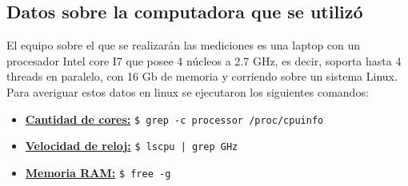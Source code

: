 \subsection{Datos sobre la computadora que se utilizó}
    El equipo sobre el que se realizarán las mediciones es una laptop con un
    procesador Intel core I7 que posee 4 núcleos a 2.7 GHz, es decir, soporta
    hasta 4 threads en paralelo, con 16 Gb de memoria y corriendo sobre un
    sistema Linux.\\
    Para averiguar estos datos en linux se ejecutaron los siguientes comandos:\\
    \begin{itemize}
        \item \underline{\textbf{Cantidad de cores:}} \lstinline[columns=fixed]{$ grep -c processor /proc/cpuinfo}
        \item \underline{\textbf{Velocidad de reloj:}} \lstinline[columns=fixed]{$ lscpu | grep GHz}
        \item \underline{\textbf{Memoria RAM:}} \lstinline[columns=fixed]{$ free -g}
    \end{itemize}